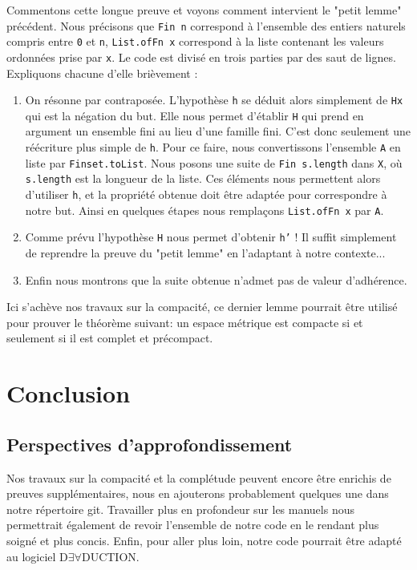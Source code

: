 \documentclass[a4paper, 12pt]{article}
\newcommand{\lean}[1]{\texttt{#1}}
\begin{document}
Commentons cette longue preuve et voyons comment intervient le "petit lemme" précédent. Nous précisons que \lean{Fin n} correspond à l'ensemble des entiers naturels compris entre \lean{0} et \lean{n}, \lean{List.ofFn x} correspond à la liste contenant les valeurs ordonnées prise par \lean{x}. Le code est divisé en trois parties par des saut de lignes. Expliquons chacune d'elle brièvement :

\begin{enumerate}
    \item On résonne par contraposée. L'hypothèse \lean{h} se déduit alors simplement de \lean{Hx} qui est la négation du but. Elle nous permet d'établir \lean{H} qui prend en argument un ensemble fini au lieu d'une famille fini. C'est donc seulement une réécriture plus simple de \lean{h}. Pour ce faire, nous convertissons l'ensemble \lean{A} en liste par \lean{Finset.toList}. Nous posons une suite de \lean{Fin s.length} dans \lean{X}, où \lean{s.length} est la longueur de la liste. Ces éléments nous permettent alors d'utiliser \lean{h}, et la propriété obtenue doit être adaptée pour correspondre à notre but. Ainsi en quelques étapes nous remplaçons \lean{List.ofFn x} par \lean{A}.
    \item Comme prévu l'hypothèse \lean{H} nous permet d'obtenir \lean{h'} ! Il suffit simplement de reprendre la preuve du "petit lemme" en l'adaptant à notre contexte...
    \item Enfin nous montrons que la suite obtenue n'admet pas de valeur d'adhérence.
\end{enumerate}

Ici s'achève nos travaux sur la compacité, ce dernier lemme pourrait être utilisé pour prouver le théorème suivant: un espace métrique est compacte si et seulement si il est complet et précompact.

\newpage
\section{Conclusion}

\subsection{Perspectives d’approfondissement}

Nos travaux sur la compacité et la complétude peuvent encore être enrichis de preuves supplémentaires, nous en ajouterons probablement quelques une dans notre répertoire git. Travailler plus en profondeur sur les manuels nous permettrait également de revoir l’ensemble de notre code en le rendant plus soigné et plus concis. Enfin, pour aller plus loin, notre code pourrait être adapté au logiciel D$\exists\forall$DUCTION.
\end{document}
